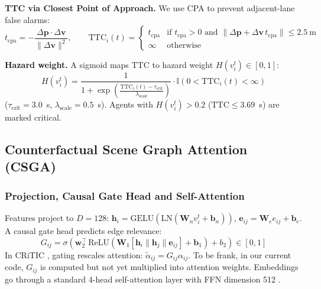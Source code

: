 \documentclass[preprint,12pt]{elsarticle}
\begin{document}
\textbf{TTC via Closest Point of Approach.} We use CPA to prevent adjacent-lane false alarms:
\begin{equation}
    t_{\text{cpa}} = -\frac{\Delta\mathbf{p} \cdot \Delta\mathbf{v}}{\|\Delta\mathbf{v}\|^2}, \qquad
    \text{TTC}_i(t) = \begin{cases}
    t_{\text{cpa}} & \text{if } t_{\text{cpa}} > 0 \text{ and } \|\Delta\mathbf{p} + \Delta\mathbf{v}\, t_{\text{cpa}}\| \le 2.5~\text{m} \\
    \infty & \text{otherwise}
    \end{cases}
    \label{eq_ttc}
\end{equation}

\textbf{Hazard weight.} A sigmoid maps TTC to hazard weight $H(v_i^t) \in [0,1]$:
\begin{equation}
    H(v_i^t) = \frac{1}{1 + \exp\left(\frac{\text{TTC}_i(t) - \tau_{\text{crit}}}{\lambda_{\text{scale}}}\right)} \cdot \mathbb{I}\left(0 < \text{TTC}_i(t) < \infty\right)
    \label{eq_hazard}
\end{equation}
($\tau_{\text{crit}} = 3.0$~s, $\lambda_{\text{scale}} = 0.5$~s). Agents with $H(v_i^t) > 0.2$ ($\text{TTC} \le 3.69$~s) are marked critical.

\subsection{Counterfactual Scene Graph Attention (CSGA)}
\subsubsection{Projection, Causal Gate Head and Self-Attention}
Features project to $D=128$: $\mathbf{h}_i = \text{GELU}(\text{LN}(\mathbf{W}_n v_i^t + \mathbf{b}_n))$, $\mathbf{e}_{ij} = \mathbf{W}_e e_{ij} + \mathbf{b}_e$. A causal gate head predicts edge relevance:
\begin{equation}
    G_{ij} = \sigma\left(\mathbf{w}_2^\top \, \text{ReLU}\left(\mathbf{W}_1 \left[\mathbf{h}_i \| \mathbf{h}_j \| \mathbf{e}_{ij}\right] + \mathbf{b}_1\right) + b_2\right) \in [0, 1]
    \label{eq_gate}
\end{equation}
In CRiTIC \cite{ahmadi2025critic}, gating rescales attention: $\tilde{\alpha}_{ij} = G_{ij} \alpha_{ij}$. To be frank, in our current code, $G_{ij}$ is computed but not yet multiplied into attention weights. Embeddings go through a standard 4-head self-attention layer with FFN dimension 512 \cite{vaswani2017attention}.
\end{document}
